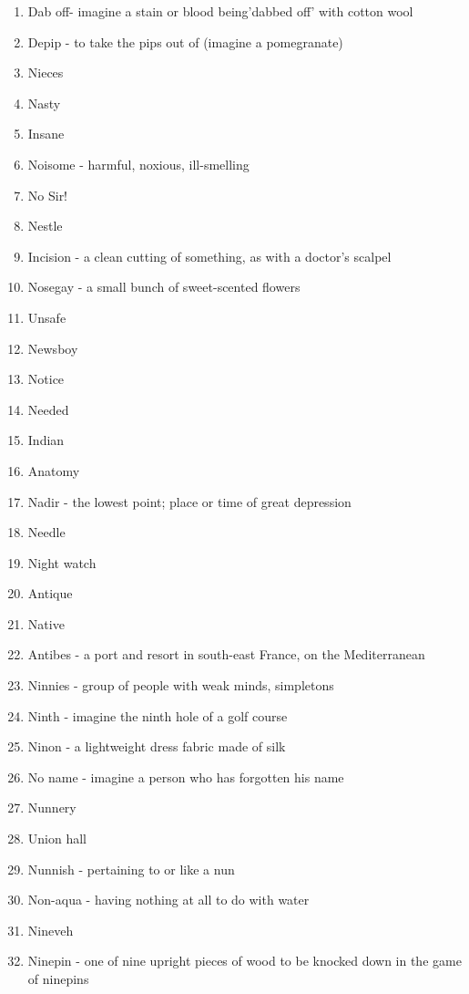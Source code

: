 \begin{enumerate}
        \item Dab off- imagine a stain or blood being'dabbed off' with cotton wool
        \item Depip - to take the pips out of (imagine a pomegranate)
        \item Nieces
        \item Nasty
        \item Insane
        \item Noisome - harmful, noxious, ill-smelling
        \item No Sir!
        \item Nestle
        \item Incision - a clean cutting of something, as with a doctor's scalpel
        \item Nosegay - a small bunch of sweet-scented flowers
        \item Unsafe
        \item Newsboy
        \item Notice
        \item Needed
        \item Indian
        \item Anatomy
        \item Nadir - the lowest point; place or time of great depression
        \item Needle
        \item Night watch
        \item Antique
        \item Native
        \item Antibes - a port and resort in south-east France, on the Mediterranean
        \item Ninnies - group of people with weak minds, simpletons
        \item Ninth - imagine the ninth hole of a golf course
        \item Ninon - a lightweight dress fabric made of silk
        \item No name - imagine a person who has forgotten his name
        \item Nunnery
        \item Union hall
        \item Nunnish - pertaining to or like a nun
        \item Non-aqua - having nothing at all to do with water
        \item Nineveh
        \item Ninepin - one of nine upright pieces of wood to be knocked down in the game of ninepins

\end{enumerate}
